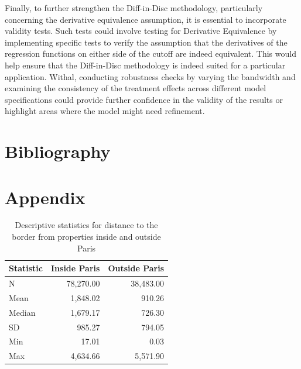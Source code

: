 \documentclass[12pt]{article}
\theoremstyle{plain}
\theoremstyle{remark}
\begin{document}
Finally, to further strengthen the Diff-in-Disc methodology, particularly concerning the derivative equivalence assumption, it is essential to incorporate validity tests. Such tests could involve testing for Derivative Equivalence by implementing specific tests to verify the assumption that the derivatives of the regression functions on either side of the cutoff are indeed equivalent. This would help ensure that the Diff-in-Disc methodology is indeed suited for a particular application.
Withal, conducting robustness checks by varying the bandwidth and examining the consistency of the treatment effects across different model specifications could provide further confidence in the validity of the results or highlight areas where the model might need refinement.

\newpage
\section{Bibliography}
\printbibliography %

\newpage
\section{Appendix}

\begin{table}[h!]
    \centering
    \begin{tabular}{lrr}
        \toprule
        \textbf{Statistic} & \textbf{Inside Paris} & \textbf{Outside Paris} \\
        \midrule
        N          & 78,270.00 & 38,483.00 \\
        Mean       & 1,848.02  & 910.26 \\
        Median     & 1,679.17  & 726.30 \\
        SD         & 985.27    & 794.05 \\
        Min        & 17.01     & 0.03 \\
        Max        & 4,634.66  & 5,571.90 \\
        \bottomrule
    \end{tabular}
    \caption{Descriptive statistics for distance to the border from properties inside and outside Paris}
    \label{tab:RV_stats}
\end{table}
\end{document}
